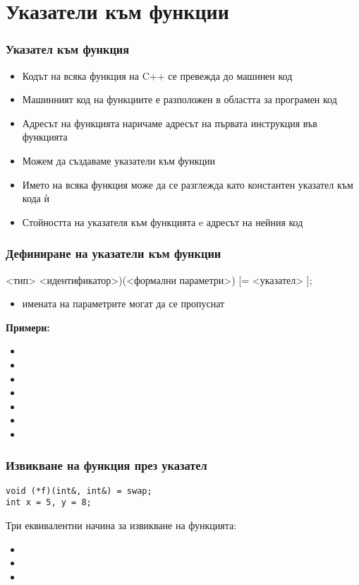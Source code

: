 \documentclass{beamer}
\begin{document}
\section{Указатели към функции}

\begin{frame}
  \frametitle{Указател към функция}

  \begin{itemize}[<+->]
  \item Кодът на всяка функция на C++ се превежда до машинен код
  \item Машинният код на функциите е разположен в областта за програмен код
  \item \alert{Адресът на функцията} наричаме адресът на първата инструкция във функцията
  \item Можем да създаваме \alert{указатели към функции}
  \item Името на всяка функция може да се разглежда като константен указател към кода ѝ
  \item Стойността на указателя към функцията e адресът на нейния код
  \end{itemize}
\end{frame}

\begin{frame}
  \frametitle{Дефиниране на указатели към функции}

  {\small
    <тип> \tta{(*}<идентификатор>\tta)\tta(<формални параметри>\tta) [\tta= <указател> ]\tta;}
  \pause
  \begin{itemize}
  \item имената на параметрите могат да се пропуснат
  \end{itemize}
  \pause
  \textbf{Примери:}
  \begin{itemize}[<+->]
  \item {}
  \item {}
  \item {}
  \item {}
  \item {}
  \item {}
  \item {}
  \end{itemize}
\end{frame}

\begin{frame}[fragile]
  \frametitle{Извикване на функция през указател}

\begin{lstlisting}
void (*f)(int&, int&) = swap;
int x = 5, y = 8;
\end{lstlisting}
  \pause
  Три еквивалентни начина за извикване на функцията:
  \begin{itemize}
  \item {}
  \item {}
  \item {}
  \end{itemize}
\end{frame}
\end{document}
